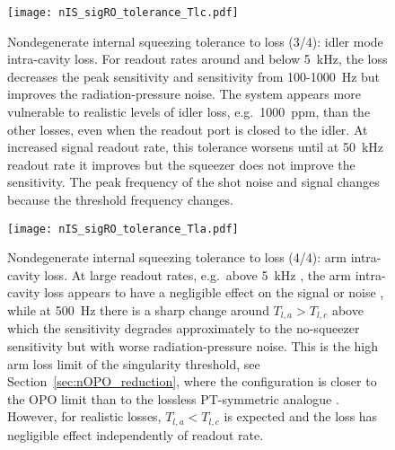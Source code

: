 \begin{figure}
    \centering
    \texttt{[image: nIS\_sigRO\_tolerance\_Tlc.pdf]}
    \caption{ Nondegenerate internal squeezing tolerance to loss (3/4): idler mode intra-cavity loss. For readout rates around and below 5~kHz, the loss decreases the peak sensitivity and sensitivity from 100-1000~Hz but improves the radiation-pressure noise. The system appears more vulnerable to realistic levels of idler loss, e.g.\ 1000~ppm, than the other losses, even when the readout port is closed to the idler. At increased signal readout rate, this tolerance worsens until at 50~kHz readout rate it improves  but the squeezer does not improve the sensitivity. The peak frequency of the shot noise and signal changes because the threshold frequency changes.}
    \label{fig:nIS_sigRO_tolerance_Tlc}
\end{figure}
\begin{figure}
    \centering
    \texttt{[image: nIS\_sigRO\_tolerance\_Tla.pdf]}
    \caption{ Nondegenerate internal squeezing tolerance to loss (4/4): arm intra-cavity loss. At large readout rates, e.g.\ above 5~kHz , the arm intra-cavity loss appears to have a negligible effect on the signal or noise , while at 500~Hz there is a sharp change around $T_{l,a}>T_{l,c}$  above which the sensitivity degrades approximately to the no-squeezer sensitivity  but with worse radiation-pressure noise. This is the high arm loss limit of the singularity threshold, see Section~\ref{sec:nOPO_reduction}, where the configuration is closer to the OPO limit than to the lossless PT-symmetric analogue . However, for realistic losses, $T_{l,a}<T_{l,c}$ is expected and the loss has negligible effect  independently of readout rate.}
    \label{fig:nIS_sigRO_tolerance_Tla}
\end{figure}

